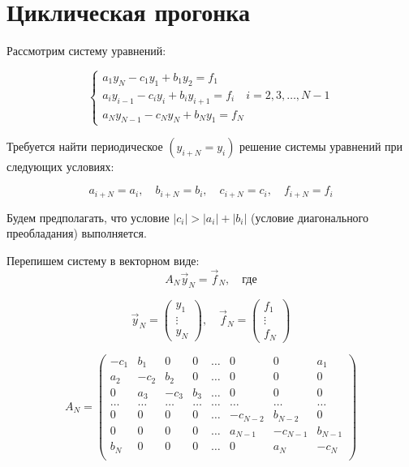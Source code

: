 \documentclass[titlepage]{article}
\def\l{\left}
\def\r{\right}
\begin{document}
\section{Циклическая прогонка}
Рассмотрим систему уравнений:

\begin{equation*}
	\begin{cases}
		a_1y_N - c_1y_1 + b_1y_2 = f_1 \\
		a_iy_{i-1} - c_iy_i + b_iy_{i+1} = f_i \quad i = 2,3,\dots,N-1 \\
		a_Ny_{N-1} - c_Ny_N + b_Ny_1 = f_N
	\end{cases}
\end{equation*}

Требуется найти периодическое $(y_{i+N} = y_i)$ решение системы уравнений при следующих условиях:

\begin{equation*}
	a_{i+N} = a_i, \quad b_{i+N} = b_i, \quad c_{i+N} = c_i, \quad f_{i+N} = f_i
\end{equation*}

Будем предполагать, что условие $|c_i| > |a_i| + |b_i|$ (условие диагонального преобладания) выполняется.

Перепишем систему в векторном виде: 
\begin{equation*}
	A_N \vec y_N = \vec f_N, \quad \text{где}
\end{equation*}

\begin{equation*}
	\vec y_N = \l(\begin{matrix} y_1 \\ \vdots \\ y_N \end{matrix}\r), \quad \vec f_N = \l(\begin{matrix} f_1 \\ \vdots \\ f_N \end{matrix}\r) 
\end{equation*}

\begin{equation*}
	A_N = \begin{pmatrix}
		-c_1 & b_1 & 0 & 0 & \dots & 0 & 0 & a_1 \\
		a_2 & -c_2 & b_2 & 0 & \dots & 0 & 0 & 0 \\
		0 & a_3 & -c_3 & b_3 & \dots & 0 & 0 & 0 \\
		\dots & \dots & \dots & \dots & \dots & \dots & \dots & \dots \\
		0 & 0 & 0 & 0 & \dots & -c_{N-2} & b_{N-2} & 0 \\
		0 & 0 & 0 & 0 & \dots & a_{N-1} & -c_{N-1} & b_{N-1} \\
		b_N & 0 & 0 & 0 & \dots & 0 & a_N & -c_N \\
	\end{pmatrix}
\end{equation*}
\end{document}
